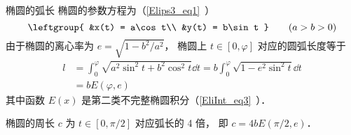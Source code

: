 \begin{example}{椭圆的弧长}\label{CurLen_ex1}
椭圆的参数方程为（\autoref{Elips3_eq1}~）
\begin{equation}
\leftgroup{
&x(t) = a\cos t\\
&y(t) = b\sin t
} \qquad
(a > b > 0)
\end{equation}
由于椭圆的离心率为 $e = \sqrt{1 - b^2/a^2}$， 椭圆上 $t \in [0, \varphi]$ 对应的圆弧长度等于
\begin{equation}
\begin{aligned}
l &= \int_0^{\varphi} \sqrt{a^2\sin^2 t + b^2 \cos^2 t} \dd{t}
= b\int_0^\varphi \sqrt{1 - e^2\sin^2 t} \dd{t}\\
&= b E(\varphi, e)
\end{aligned}
\end{equation}
其中函数 $E(x)$ 是第二类不完整椭圆积分（\autoref{EliInt_eq3}~）．

椭圆的周长 $c$ 为 $t \in [0, \pi/2]$ 对应弧长的 4 倍， 即 $c = 4bE(\pi/2, e)$．
\end{example}
